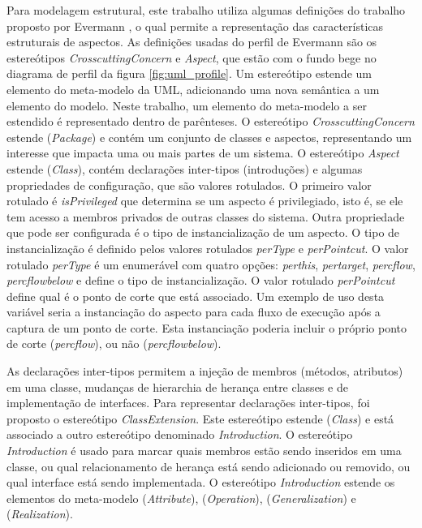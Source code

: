 Para modelagem estrutural, este trabalho utiliza algumas definições do trabalho proposto por Evermann \cite{Evermann:2007:MSP:1229375.1229379}, o qual
permite a representação das características estruturais de aspectos. As definições usadas do perfil de Evermann são os 
estereótipos \textit{CrosscuttingConcern} e \textit{Aspect}, que estão com o fundo bege no diagrama de perfil da figura
\ref{fig:uml_profile}. Um estereótipo estende um elemento do meta-modelo da UML, adicionando uma nova semântica a um elemento do modelo. Neste
trabalho, um elemento do meta-modelo a ser estendido é representado dentro de parênteses. O estereótipo \textit{CrosscuttingConcern} estende
(\textit{Package}) e contém um conjunto de classes e aspectos, representando um interesse que impacta uma ou mais partes de um sistema. O estereótipo
\textit{Aspect} estende (\textit{Class}), contém declarações inter-tipos (introduções) e algumas propriedades de configuração, que são valores
rotulados. O primeiro valor rotulado é \textit{isPrivileged} que determina se um aspecto é privilegiado, isto é, se ele tem acesso a membros privados
de outras classes do sistema. Outra propriedade que pode ser configurada é o tipo de instancialização de um aspecto. O tipo de instancialização é
definido pelos valores rotulados \textit{perType} e \textit{perPointcut}. O valor rotulado \textit{perType} é um enumerável com quatro opções:
\textit{perthis}, \textit{pertarget}, \textit{percflow}, \textit{percflowbelow} e define o tipo de instancialização. O valor
rotulado \textit{perPointcut} define qual é o ponto de corte que está associado. Um exemplo de uso desta variável seria a instanciação do aspecto para
cada fluxo de execução após a captura de um ponto de corte. Esta instanciação poderia incluir o próprio ponto de corte (\textit{percflow}), ou não (\textit{percflowbelow}). 

As declarações inter-tipos permitem a injeção de membros (métodos, atributos) em uma classe, mudanças de hierarchia de herança entre classes e de
implementação de interfaces. Para representar declarações inter-tipos, foi proposto o estereótipo \textit{ClassExtension}. Este estereótipo estende (\textit{Class}) e
está associado a outro estereótipo denominado \textit{Introduction}. O estereótipo \textit{Introduction} é usado para marcar quais membros estão sendo
inseridos em uma classe, ou qual relacionamento de herança está sendo adicionado ou removido, ou qual interface está sendo implementada. O estereótipo
\textit{Introduction} estende os elementos do meta-modelo (\textit{Attribute}), (\textit{Operation}), (\textit{Generalization}) e
(\textit{Realization}).

